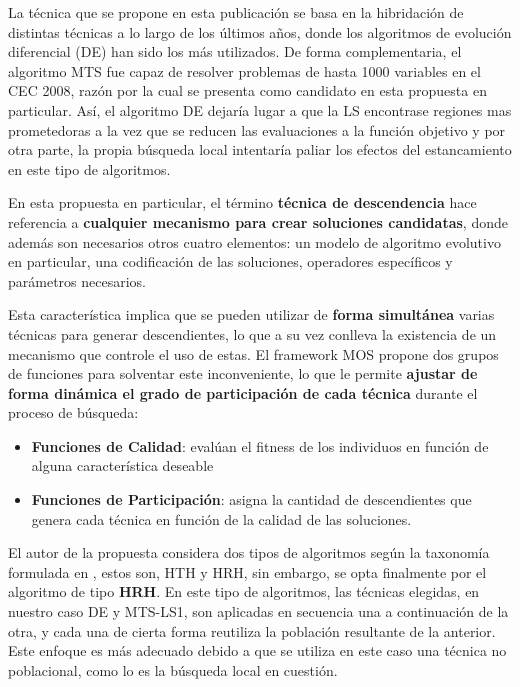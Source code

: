 La técnica que se propone en esta publicación se basa en la hibridación de distintas técnicas a lo largo de los últimos años, donde los algoritmos de evolución diferencial (DE) han sido los más utilizados. De forma complementaria, el algoritmo MTS\cite{MTS-LSGO} fue capaz de resolver problemas de hasta 1000 variables en el CEC 2008, razón por la cual se presenta como candidato en esta propuesta en particular. Así, el algoritmo DE dejaría lugar a que la LS encontrase regiones mas prometedoras a la vez que se reducen las evaluaciones a la función objetivo y por otra parte, la propia búsqueda local intentaría paliar los efectos del estancamiento en este tipo de algoritmos.

En esta propuesta en particular, el término \textbf{técnica de descendencia} hace referencia a \textbf{cualquier mecanismo para crear soluciones candidatas}, donde además son necesarios otros cuatro elementos: un modelo de algoritmo evolutivo en particular, una codificación de las soluciones, operadores específicos y parámetros necesarios. 

Esta característica implica que se pueden utilizar de \textbf{forma simultánea} varias técnicas para generar descendientes, lo que a su vez conlleva la existencia de un mecanismo que controle el uso de estas. El framework MOS propone dos grupos de funciones para solventar este inconveniente, lo que le permite \textbf{ajustar de forma dinámica el grado de participación de cada técnica} durante el proceso de búsqueda:

\begin{itemize}
	\item \textbf{Funciones de Calidad}: evalúan el fitness de los individuos en función de alguna característica deseable
	\item \textbf{Funciones de Participación}: asigna la cantidad de descendientes que genera cada técnica en función de la calidad de las soluciones.
\end{itemize}

El autor de la propuesta considera dos tipos de algoritmos según la taxonomía formulada en \cite{TaxonomyEAs}, estos son, HTH y HRH, sin embargo, se opta finalmente por el algoritmo de tipo \textbf{HRH}. En este tipo de algoritmos, las técnicas elegidas, en nuestro caso DE y MTS-LS1, son aplicadas en secuencia una a continuación de la otra, y cada una de cierta forma reutiliza la población resultante de la anterior. Este enfoque es más adecuado debido a que se utiliza en este caso una técnica no poblacional, como lo es la búsqueda local en cuestión.

